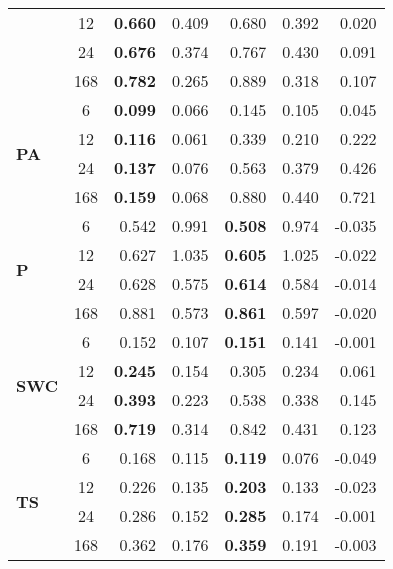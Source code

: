 \begin{table}
\begin{tabular}{p{2.1cm}c|rr|rr|r}
 & 12 & \bfseries 0.660 & 0.409 & 0.680 & 0.392 & 0.020 \\
 & 24 & \bfseries 0.676 & 0.374 & 0.767 & 0.430 & 0.091 \\
 & 168 & \bfseries 0.782 & 0.265 & 0.889 & 0.318 & 0.107 \\
\cline{1-7}
\multirow[c]{4}{*}{\parbox{2.1cm}{\textbf{PA}}} & 6 & \bfseries 0.099 & 0.066 & 0.145 & 0.105 & 0.045 \\
 & 12 & \bfseries 0.116 & 0.061 & 0.339 & 0.210 & 0.222 \\
 & 24 & \bfseries 0.137 & 0.076 & 0.563 & 0.379 & 0.426 \\
 & 168 & \bfseries 0.159 & 0.068 & 0.880 & 0.440 & 0.721 \\
\cline{1-7}
\multirow[c]{4}{*}{\parbox{2.1cm}{\textbf{P}}} & 6 & 0.542 & 0.991 & \bfseries 0.508 & 0.974 & -0.035 \\
 & 12 & 0.627 & 1.035 & \bfseries 0.605 & 1.025 & -0.022 \\
 & 24 & 0.628 & 0.575 & \bfseries 0.614 & 0.584 & -0.014 \\
 & 168 & 0.881 & 0.573 & \bfseries 0.861 & 0.597 & -0.020 \\
\cline{1-7}
\multirow[c]{4}{*}{\parbox{2.1cm}{\textbf{SWC}}} & 6 & 0.152 & 0.107 & \bfseries 0.151 & 0.141 & -0.001 \\
 & 12 & \bfseries 0.245 & 0.154 & 0.305 & 0.234 & 0.061 \\
 & 24 & \bfseries 0.393 & 0.223 & 0.538 & 0.338 & 0.145 \\
 & 168 & \bfseries 0.719 & 0.314 & 0.842 & 0.431 & 0.123 \\
\cline{1-7}
\multirow[c]{4}{*}{\parbox{2.1cm}{\textbf{TS}}} & 6 & 0.168 & 0.115 & \bfseries 0.119 & 0.076 & -0.049 \\
 & 12 & 0.226 & 0.135 & \bfseries 0.203 & 0.133 & -0.023 \\
 & 24 & 0.286 & 0.152 & \bfseries 0.285 & 0.174 & -0.001 \\
 & 168 & 0.362 & 0.176 & \bfseries 0.359 & 0.191 & -0.003 \\
\cline{1-7}
\bottomrule
\end{tabular}
\end{table}
